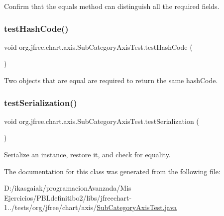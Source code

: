 Confirm that the equals method can distinguish all the required fields. \mbox{\label{classorg_1_1jfree_1_1chart_1_1axis_1_1_sub_category_axis_test_a590e41907e5ce44911973ecc4b90afc4}} 
\subsubsection{\texorpdfstring{test\+Hash\+Code()}{testHashCode()}}
{\footnotesize\ttfamily void org.\+jfree.\+chart.\+axis.\+Sub\+Category\+Axis\+Test.\+test\+Hash\+Code (\begin{DoxyParamCaption}{ }\end{DoxyParamCaption})}

Two objects that are equal are required to return the same hash\+Code. \mbox{\label{classorg_1_1jfree_1_1chart_1_1axis_1_1_sub_category_axis_test_a12641eb701fe29f5dd042c71572fb721}} 
\subsubsection{\texorpdfstring{test\+Serialization()}{testSerialization()}}
{\footnotesize\ttfamily void org.\+jfree.\+chart.\+axis.\+Sub\+Category\+Axis\+Test.\+test\+Serialization (\begin{DoxyParamCaption}{ }\end{DoxyParamCaption})}

Serialize an instance, restore it, and check for equality. 

The documentation for this class was generated from the following file\+:\begin{DoxyCompactItemize}
\item 
D\+:/ikasgaiak/programacion\+Avanzada/\+Mis Ejercicios/\+P\+B\+Ldefinitibo2/libs/jfreechart-\/1../tests/org/jfree/chart/axis/\mbox{\hyperlink{_sub_category_axis_test_8java}{Sub\+Category\+Axis\+Test.\+java}}\end{DoxyCompactItemize}
